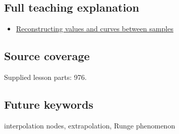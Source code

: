 \subsection{Full teaching explanation}\label{appendix-0c2a5f69851e-full-teaching-explanation}

\begin{itemize}
\tightlist
\item
  \hyperref[02-foundations-ii-ch028-reconstructing-values-and-curves-between-samples]{Reconstructing values and curves between samples}
\end{itemize}

\subsection{Source coverage}\label{appendix-0c2a5f69851e-source-coverage}

Supplied lesson parts: 976.

\subsection{Future keywords}\label{appendix-0c2a5f69851e-future-keywords}

interpolation nodes, extrapolation, Runge phenomenon
